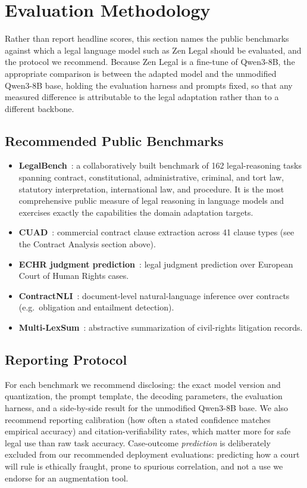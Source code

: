 \documentclass[11pt,a4paper]{article}
\begin{document}
\section{Evaluation Methodology}

Rather than report headline scores, this section names the public benchmarks against which a legal language model such as Zen Legal should be evaluated, and the protocol we recommend. Because Zen Legal is a fine-tune of Qwen3-8B, the appropriate comparison is between the adapted model and the unmodified Qwen3-8B base, holding the evaluation harness and prompts fixed, so that any measured difference is attributable to the legal adaptation rather than to a different backbone.

\subsection{Recommended Public Benchmarks}

\begin{itemize}
  \item \textbf{LegalBench}~\cite{legalbench}: a collaboratively built benchmark of 162 legal-reasoning tasks spanning contract, constitutional, administrative, criminal, and tort law, statutory interpretation, international law, and procedure. It is the most comprehensive public measure of legal reasoning in language models and exercises exactly the capabilities the domain adaptation targets.
  \item \textbf{CUAD}~\cite{cuad}: commercial contract clause extraction across 41 clause types (see the Contract Analysis section above).
  \item \textbf{ECHR judgment prediction}~\cite{echr}: legal judgment prediction over European Court of Human Rights cases.
  \item \textbf{ContractNLI}~\cite{contractnli}: document-level natural-language inference over contracts (e.g.\ obligation and entailment detection).
  \item \textbf{Multi-LexSum}~\cite{multilexsum}: abstractive summarization of civil-rights litigation records.
\end{itemize}

\subsection{Reporting Protocol}

For each benchmark we recommend disclosing: the exact model version and quantization, the prompt template, the decoding parameters, the evaluation harness, and a side-by-side result for the unmodified Qwen3-8B base. We also recommend reporting calibration (how often a stated confidence matches empirical accuracy) and citation-verifiability rates, which matter more for safe legal use than raw task accuracy. Case-outcome \emph{prediction} is deliberately excluded from our recommended deployment evaluations: predicting how a court will rule is ethically fraught, prone to spurious correlation, and not a use we endorse for an augmentation tool.
\end{document}
